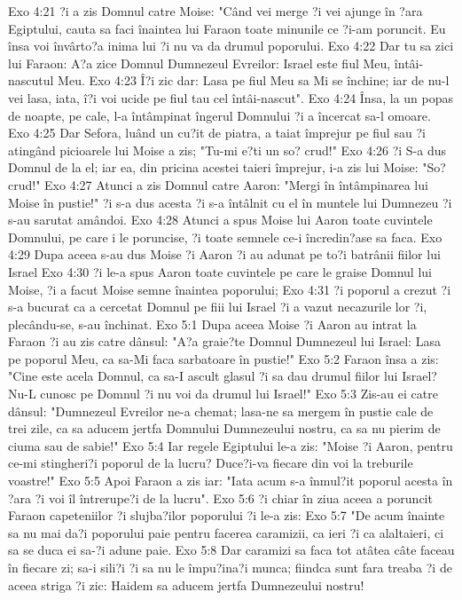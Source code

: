 Exo 4:21  ?i a zis Domnul catre Moise: "Când vei merge ?i vei ajunge în ?ara Egiptului, cauta sa faci înaintea lui Faraon toate minunile ce ?i-am poruncit. Eu însa voi învârto?a inima lui ?i nu va da drumul poporului.
Exo 4:22  Dar tu sa zici lui Faraon: A?a zice Domnul Dumnezeul Evreilor: Israel este fiul Meu, întâi-nascutul Meu.
Exo 4:23  Î?i zic dar: Lasa pe fiul Meu sa Mi se închine; iar de nu-l vei lasa, iata, î?i voi ucide pe fiul tau cel întâi-nascut".
Exo 4:24  Însa, la un popas de noapte, pe cale, l-a întâmpinat îngerul Domnului ?i a încercat sa-l omoare.
Exo 4:25  Dar Sefora, luând un cu?it de piatra, a taiat împrejur pe fiul sau ?i atingând picioarele lui Moise a zis; "Tu-mi e?ti un so? crud!"
Exo 4:26  ?i S-a dus Domnul de la el; iar ea, din pricina acestei taieri împrejur, i-a zis lui Moise: "So? crud!"
Exo 4:27  Atunci a zis Domnul catre Aaron: "Mergi în întâmpinarea lui Moise în pustie!" ?i s-a dus acesta ?i s-a întâlnit cu el în muntele lui Dumnezeu ?i s-au sarutat amândoi.
Exo 4:28  Atunci a spus Moise lui Aaron toate cuvintele Domnului, pe care i le poruncise, ?i toate semnele ce-i încredin?ase sa faca.
Exo 4:29  Dupa aceea s-au dus Moise ?i Aaron ?i au adunat pe to?i batrânii fiilor lui Israel
Exo 4:30  ?i le-a spus Aaron toate cuvintele pe care le graise Domnul lui Moise, ?i a facut Moise semne înaintea poporului;
Exo 4:31  ?i poporul a crezut ?i s-a bucurat ca a cercetat Domnul pe fiii lui Israel ?i a vazut necazurile lor ?i, plecându-se, s-au închinat.
Exo 5:1  Dupa aceea Moise ?i Aaron au intrat la Faraon ?i au zis catre dânsul: "A?a graie?te Domnul Dumnezeul lui Israel: Lasa pe poporul Meu, ca sa-Mi faca sarbatoare în pustie!"
Exo 5:2  Faraon însa a zis: "Cine este acela Domnul, ca sa-I ascult glasul ?i sa dau drumul fiilor lui Israel? Nu-L cunosc pe Domnul ?i nu voi da drumul lui Israel!"
Exo 5:3  Zis-au ei catre dânsul: "Dumnezeul Evreilor ne-a chemat; lasa-ne sa mergem în pustie cale de trei zile, ca sa aducem jertfa Domnului Dumnezeului nostru, ca sa nu pierim de ciuma sau de sabie!"
Exo 5:4  Iar regele Egiptului le-a zis: "Moise ?i Aaron, pentru ce-mi stingheri?i poporul de la lucru? Duce?i-va fiecare din voi la treburile voastre!"
Exo 5:5  Apoi Faraon a zis iar: "Iata acum s-a înmul?it poporul acesta în ?ara ?i voi îl întrerupe?i de la lucru".
Exo 5:6  ?i chiar în ziua aceea a poruncit Faraon capeteniilor ?i slujba?ilor poporului ?i le-a zis:
Exo 5:7  "De acum înainte sa nu mai da?i poporului paie pentru facerea caramizii, ca ieri ?i ca alaltaieri, ci sa se duca ei sa-?i adune paie.
Exo 5:8  Dar caramizi sa faca tot atâtea câte faceau în fiecare zi; sa-i sili?i ?i sa nu le împu?ina?i munca; fiindca sunt fara treaba ?i de aceea striga ?i zic: Haidem sa aducem jertfa Dumnezeului nostru!
